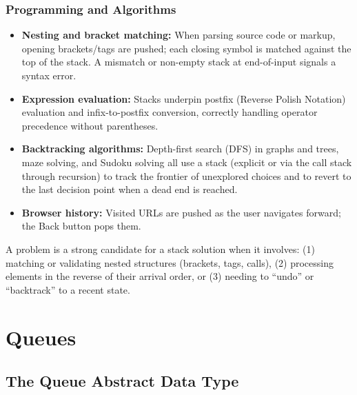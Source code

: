 \documentclass[11pt, a4paper, notitlepage]{report}
\theoremstyle{definition}
\theoremstyle{remark}
\theoremstyle{definition}
\begin{document}
\subsection{Programming and Algorithms}
\label{subsec:stack-programming}

\begin{itemize}
  \item \textbf{Nesting and bracket matching:} When parsing source code or markup,
        opening brackets/tags are pushed; each closing symbol is matched against the
        top of the stack. A mismatch or non-empty stack at end-of-input signals a
        syntax error.
  \item \textbf{Expression evaluation:} Stacks underpin postfix (Reverse Polish
        Notation) evaluation and infix-to-postfix conversion, correctly handling
        operator precedence without parentheses.
  \item \textbf{Backtracking algorithms:} Depth-first search (DFS) in graphs and trees,
        maze solving, and Sudoku solving all use a stack (explicit or via the call
        stack through recursion) to track the frontier of unexplored choices and to
        revert to the last decision point when a dead end is reached.
  \item \textbf{Browser history:} Visited URLs are pushed as the user navigates forward;
        the Back button pops them.
\end{itemize}

\begin{examtip}[title={Exam Tip: Recognising Stack Problems}]
A problem is a strong candidate for a stack solution when it involves:
(1) matching or validating nested structures (brackets, tags, calls),
(2) processing elements in the reverse of their arrival order, or
(3) needing to ``undo'' or ``backtrack'' to a recent state.
\end{examtip}



\chapter{Queues}
\label{ch:queues}

\section{The Queue Abstract Data Type}
\label{sec:queue-adt}
\end{document}
